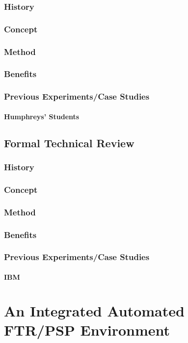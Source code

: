 \subsection{History}
\subsection{Concept}
\subsection{Method}
\subsection{Benefits}
\subsection{Previous Experiments/Case Studies}
\subsubsection{Humphreys' Students}
\section{Formal Technical Review}
\subsection{History}
\subsection{Concept}
\subsection{Method}
\subsection{Benefits}
\subsection{Previous Experiments/Case Studies}
\subsubsection{IBM}

\chapter{An Integrated Automated FTR/PSP Environment}
